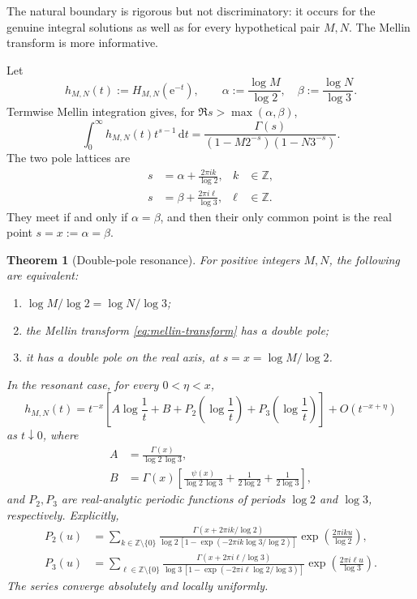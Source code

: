 \documentclass[11pt]{article}
\numberwithin{equation}{section}
\newtheorem{theorem}{Theorem}[section]
\theoremstyle{definition}
\theoremstyle{remark}
\newcommand{\Z}{\mathbb{Z}}
\newcommand{\e}{\mathrm{e}}
\newcommand{\dd}{\,\mathrm{d}}
\begin{document}
The natural boundary is rigorous but not discriminatory: it occurs for the genuine integral solutions as well as for every hypothetical pair $M,N$.  The Mellin transform is more informative.

Let
\[
 h_{M,N}(t):=H_{M,N}(\e^{-t}),\qquad
 \alpha:=\frac{\log M}{\log2},\quad
 \beta:=\frac{\log N}{\log3}.
\]
Termwise Mellin integration gives, for $\Re s>\max(\alpha,\beta)$,
\begin{equation}
 \int_0^\infty h_{M,N}(t)t^{s-1}\dd t
 =\frac{\Gamma(s)}{(1-M2^{-s})(1-N3^{-s})}.
 \label{eq:mellin-transform}
\end{equation}
The two pole lattices are
\begin{align}
 s&=\alpha+\frac{2\pi i k}{\log2},&k&\in\Z,\label{eq:poles2}\\
 s&=\beta +\frac{2\pi i \ell}{\log3},&\ell&\in\Z.\label{eq:poles3}
\end{align}
They meet if and only if $\alpha=\beta$, and then their only common point is the real point $s=x:=\alpha=\beta$.

\begin{theorem}[Double-pole resonance]
\label{thm:resonance}
For positive integers $M,N$, the following are equivalent:
\begin{enumerate}[label=(\roman*)]
\item $\log M/\log2=\log N/\log3$;
\item the Mellin transform \eqref{eq:mellin-transform} has a double pole;
\item it has a double pole on the real axis, at $s=x=\log M/\log2$.
\end{enumerate}
In the resonant case, for every $0<\eta<x$,
\begin{equation}
 h_{M,N}(t)=t^{-x}\left[A\log\frac1t+B+P_2\!\left(\log\frac1t\right)+P_3\!\left(\log\frac1t\right)\right]
 +O(t^{-x+\eta})
 \label{eq:resonance-asymptotic}
\end{equation}
as $t\downarrow0$, where
\begin{align}
 A&=\frac{\Gamma(x)}{\log2\,\log3},\label{eq:A}\qquad\\
 B&=\Gamma(x)\left[
 \frac{\psi(x)}{\log2\,\log3}
 +\frac{1}{2\log2}+\frac{1}{2\log3}
 \right],\label{eq:B}
\end{align}
and $P_2,P_3$ are real-analytic periodic functions of periods $\log2$ and $\log3$, respectively.  Explicitly,
\begin{align}
 P_2(u)&=\sum_{k\in\Z\setminus\{0\}}
 \frac{\Gamma(x+2\pi i k/\log2)}{\log2\,[1-\exp(-2\pi i k\log3/\log2)]}
 \exp\!\left(\frac{2\pi i k u}{\log2}\right),\label{eq:P2}\\
 P_3(u)&=\sum_{\ell\in\Z\setminus\{0\}}
 \frac{\Gamma(x+2\pi i \ell/\log3)}{\log3\,[1-\exp(-2\pi i \ell\log2/\log3)]}
 \exp\!\left(\frac{2\pi i \ell u}{\log3}\right).
 \label{eq:P3}
\end{align}
The series converge absolutely and locally uniformly.
\end{theorem}
\end{document}

